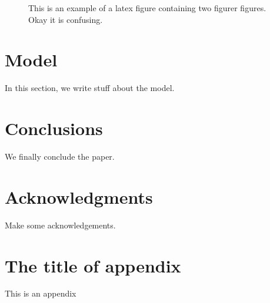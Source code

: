 \documentclass[twoside]{article}
\begin{document}
\begin{figure}[]
\caption{This is an example of a latex figure containing two figurer figures. Okay it is confusing.}
\label{example_fig}
\end{figure}

\section{Model}

In this section, we write stuff about the model.

\section{Conclusions}
\label{Sec:summary}
We finally conclude the paper.

\section*{Acknowledgments}
Make some acknowledgements.

\appendix


\section{The title of appendix} \label{appendix1}
This is an appendix
\end{document}
